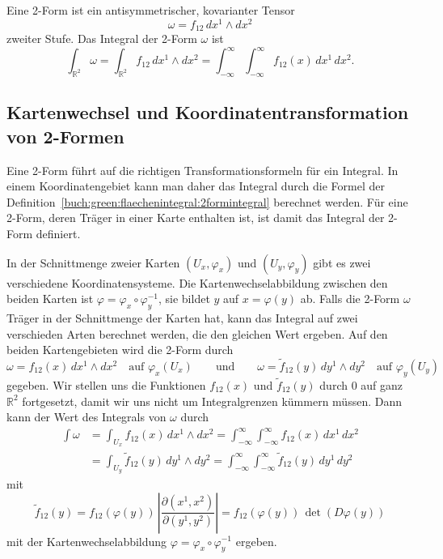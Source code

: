 \begin{definition}
\label{buch:green:flaechenintegral:2formintegral}
Eine 2-Form ist ein antisymmetrischer, kovarianter Tensor
%
\[
\omega
=
f_{12}\, dx^1\wedge dx^2
\]
zweiter Stufe.
Das Integral der 2-Form $\omega$ ist
\[
\int_{\mathbb{R}^2}
\omega
=
\int_{\mathbb{R}^2}
f_{12}\, dx^1\wedge dx^2
=
\int_{-\infty}^\infty
\int_{-\infty}^\infty
f_{12}(x)
\,
dx^1\,dx^2.
\]
\end{definition}

%
%
\subsection{Kartenwechsel und Koordinatentransformation von 2-Formen}
Eine 2-Form führt auf die richtigen Transformationsformeln für ein Integral.
In einem Koordinatengebiet kann man daher das Integral durch die Formel
der Definition~\ref{buch:green:flaechenintegral:2formintegral}
berechnet werden.
Für eine 2-Form, deren Träger in einer Karte enthalten ist, ist
damit das Integral der 2-Form definiert.

In der Schnittmenge zweier Karten $(U_x,\varphi_x)$ und $(U_y,\varphi_y)$
gibt es zwei verschiedene Koordinatensysteme.
Die Kartenwechselabbildung zwischen den beiden Karten ist
$\varphi=\varphi_x\circ\varphi_y^{-1}$, sie bildet $y$ auf
$x=\varphi(y)$ ab.
Falls die 2-Form $\omega$ Träger in der Schnittmenge der Karten hat,
kann das Integral auf zwei verschieden Arten berechnet werden,
die den gleichen Wert ergeben.
Auf den beiden Kartengebieten wird die 2-Form durch
\[
\omega
=
f_{12}(x)\,dx^1\wedge dx^2\quad\text{auf $\varphi_x(U_x)$}
\qquad\text{und}\qquad
\omega
=
\tilde{f}_{12}(y)\,dy^1\wedge dy^2\quad\text{auf $\varphi_y(U_y)$}
\]
gegeben.
Wir stellen uns die Funktionen $f_{12}(x)$ und $\tilde{f}_{12}(y)$
durch 0 auf ganz $\mathbb{R}^2$ fortgesetzt, damit wir uns nicht um
Integralgrenzen kümmern müssen.
Dann kann der Wert des Integrals von $\omega$ durch
\begin{align*}
\int \omega
&=
\int_{U_x} f_{12}(x) \,dx^1\wedge dx^2
=
\int_{-\infty}^\infty\int_{-\infty}^\infty f_{12}(x)\,dx^1\,dx^2
\\
&=
\int_{U_y} \tilde{f}_{12}(y) \,dy^1\wedge dy^2
=
\int_{-\infty}^\infty\int_{-\infty}^\infty \tilde{f}_{12}(y)\,dy^1\,dy^2
\end{align*}
mit
\[
\tilde{f}_{12}(y)
=
f_{12}(\varphi(y))
\,
\left|
\frac{\partial(x^1,x^2)}{\partial(y^1,y^2)}
\right|
=
f_{12}(\varphi(y))
\,
\det(D\varphi(y))
\]
mit der Kartenwechselabbildung $\varphi=\varphi_x\circ\varphi_y^{-1}$
ergeben.

